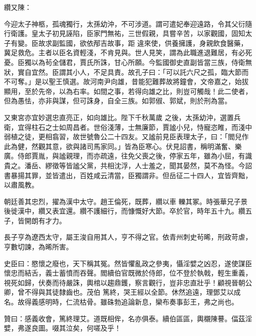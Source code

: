 \begin{pinyinscope}
 纘又陳：



 今迎太子神柩，孤魂獨行，太孫幼沖，不可涉道。謂可遣妃奉迎遠路，令其父衍隨行衛護。皇太子初見誣陷，臣家門無祐，三世假親，具嘗辛苦，以家觀國，固知太子有變。臣故求副監國，欲依邴吉故事，距
 違來使，供養擁護，身親飲食醫藥，冀足救危。主者以臣名資輕淺，不肯見與。世人見笑，謂為此職進退難居，有必死憂。臣獨以為茍全儲君，賈氏所誅，甘心所願。今監國御史直副皆當三族，侍衛無狀，實自宜然。臣謂其小人，不足具責。故孔子曰：「可以託六尺之孤，臨大節而不可奪。」是以聖王慎選。故河南尹向雄，昔能犯難葬故將鐘會，文帝嘉之，始拔顯用，至於先帝，以為右率。如間之事，若得向雄之比，則豈可觸哉！此二使者，但為愚怯，亦非與謀，但可誅身，自全三族。如郭俶、郭斌，則於刑為當。



 又東宮亦宜妙選忠直亮正，如向雄比。陛下千秋萬歲
 之後，太孫幼沖，選置兵衛，宜得柱石之士如周昌者。世俗淺薄，士無廉節，賈謐小兒，恃寵恣睢，而淺中弱植之徒，更相翕習，故世號魯公二十四友。又謐前見臣表理太子，曰：「閻兒作此為健，然觀其意，欲與諸司馬家同。」皆為臣寒心。伏見詔書，稱明滿奮、樂廣。侍郎賈胤，與謐親理，而亦疏遠，往免父喪之後，停家五年，雖為小屈，有識貴之。潘岳、繆徵等皆謐父黨，共相沈浮，人士羞之，聞其晏然，莫不為怪。今詔書暴揚其罪，並皆遣出，百姓咸云清當，臣獨謂非。但岳征二十四人，宜皆齊黜，以肅風教。



 朝廷善其忠烈，擢為漢中太守。趙王倫死，既葬，纘以車
 轢其冢。時張華兄子景後徙漢中，纘又表宜還。纘不護細行，而慷慨好大節。卒於官，時年五十九。纘五子，皆開朗有才力。



 長子亨為遼西太守，屬王浚自用其人，亨不得之官。依青州刺史茍晞，刑政苛虐，亨數切諫，為晞所害。



 史臣曰：愍懷之廢也，天下稱其冤。然皆懼亂政之參夷，懾淫嬖之凶忍，遂使謀臣懷忠而結舌，義士蓄憤而吞聲。閻續伯官既微於侍郎，位不登於執戟，輕生重義，視死如歸，伏奏而待嚴誅，輿棺以趨鼎鑊，察言觀行，豈非忠直壯乎！顧視晉朝公卿，曾不得與其徒隸齒也。茂伯
 篤終，哭王經以全節。休然追遠，理鄧艾以成名。故得義感明時，仁流枯骨。雖硃勃追論新息，欒布奏事彭王，弗之尚也。



 贊曰：感義收會，篤終理艾。道既相侔，名亦俱泰。續伯區區，輿櫬陳謩。偪茲淫嬖，弗遂良圖。啜其泣矣，何嗟及乎！



\end{pinyinscope}